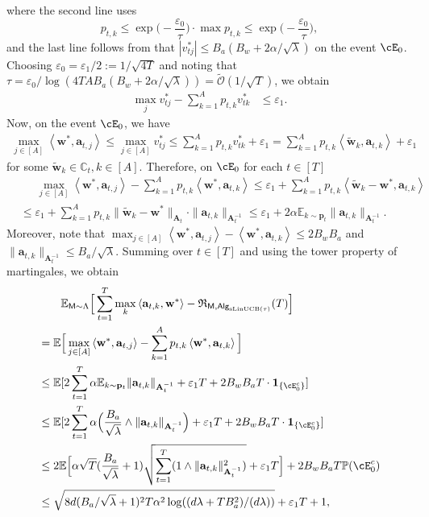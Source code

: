 \documentclass[10pt]{article}
\newcommand{\eps}{\varepsilon}
\newcommand{\<}{\left\langle}
\renewcommand{\>}{\right\rangle}
\newcommand{\E}{\mathbb{E}}
\renewcommand{\P}{\mathbb{P}}
\newcommand{\inst}{{\mathsf{M}}}
\newcommand{\sLinUCB}{{\mathrm{sLinUCB}}}
\newcommand{\temp}{{\tau}}
\newcommand{\tcO}{{\tilde{\mathcal O}}}
\newcommand{\totlen}{{T}}
\newcommand{\sAlg}{{\mathsf{Alg}}}
\newcommand{\prior}{{\Lambda}}
\newcommand{\totreward}{{\mathfrak{R}}}
\def\sC{{\mathbb{C}}}
\def\bA{{\mathbf A}}
\def\ba{{\mathbf a}}
\def\bp{{\mathbf p}}
\def\bw{{\mathbf w}}
\begin{document}
where the second line uses $$
p_{t,k}\leq\exp\Big(-\frac{\eps_0}{\temp}\Big)\cdot\max{p_{t,k}}\leq \exp\Big(-\frac{\eps_0}{\temp}\Big),
$$ and the  last line follows from that $|v^*_{tj}|\leq B_a(B_w+2\alpha/\sqrt{\lambda})$
 on the event $\cE_0$. Choosing $\eps_0=\eps_1/2:=1/\sqrt{4T}$ and noting that $\temp=\eps_0/\log(4TA B_a(B_w+2\alpha/\sqrt{\lambda}))=\tcO(1/\sqrt{T})$, we obtain
 \begin{align*}
    \max_{j}v^*_{tj}-\sum_{k=1}^A p_{t,k}v^*_{tk}&\leq\eps_1.
\end{align*}
Now, on the event $\cE_0$, we have
\begin{align*}
    \max_{j\in[A]}\<\bw^*,\ba_{t,j}\>\leq  \max_{j\in[A]}v^*_{tj}\leq \sum_{k=1}^A p_{t,k}v^*_{tk}+\eps_1 =\sum_{k=1}^A p_{t,k}\<\tilde{\bw}_k,\ba_{t,k}\>+\eps_1
\end{align*}
for some $\tilde{\bw}_k\in\sC_t,k\in[A]$.
Therefore,  on $\cE_0$ for  each $t\in[T]$
\begin{align*}
    &~~\quad\max_{j\in[A]}\<\bw^*,\ba_{t,j}\>-\sum_{k=1}^Ap_{t,k}\<\bw^*,\ba_{t,k}\>
    \leq \eps_1+ \sum_{k=1}^Ap_{t,k}\<\tilde{\bw}_k-\bw^*,\ba_{t,k}\>
    \\&\leq
    \eps_1+\sum_{k=1}^Ap_{t,k}\|\tilde{\bw}_k-\bw^*\|_{\bA_t}\cdot\|\ba_{t,k}\|_{\bA^{-1}_t}
    \leq \eps_1+ 2\alpha\E_{k\sim \bp_t}\|\ba_{t,k}\|_{\bA^{-1}_t}.
\end{align*}
 Moreover, note that $ \max_{j\in[A]}\<\bw^*,\ba_{t,j}\>-\<\bw^*,\ba_{t,k}\>\leq 2B_wB_a$ and $\|\ba_{t,k}\|_{\bA^{-1}_t}\leq B_a/\sqrt{\lambda}$.
Summing over $t\in[T]$ and using the tower property of martingales, we obtain
\begin{align*}
&\qquad\E_{\inst\sim\prior}\Big[\sum_{t=1}^\totlen\max_{k}\<\ba_{t,k},\bw^*\>-\totreward_{\inst,\sAlg_{\sLinUCB(\temp)}}(\totlen)\Big]\\
&=
\E\Big[\max_{j\in[A]}\<\bw^*,\ba_{t,j}\>-\sum_{k=1}^Ap_{t,k}\<\bw^*,\ba_{t,k}\>
 \Big]
\\
&\leq \E[2\sum_{t=1}^T\alpha\E_{k\sim \bp_t}\|\ba_{t,k}\|_{\bA^{-1}_t}+\eps_1 T +2B_wB_a T\cdot\mathbf{1}_{\{\cE^c_0\}}]\\
   &\leq
\E[2\sum_{t=1}^T\alpha\Big(\frac{B_a}{\sqrt{\lambda}}\wedge\|\ba_{t,k}\|_{\bA^{-1}_t}\Big)+\eps_1 T +2B_wB_a T\cdot\mathbf{1}_{\{\cE^c_0\}}]\\
   &\leq
2\E\Big[\alpha\sqrt{T}(\frac{B_a}{\sqrt{\lambda}}+1)\sqrt{\sum_{t=1}^T(1\wedge\|\ba_{t,k}\|^2_{\bA^{-1}_t})}+\eps_1 T\Big]+2B_wB_a T\P(\cE^c_0)\\
&\leq
\sqrt{8 d({B_a}/{\sqrt{\lambda}}+1)^2T\alpha^2\log((d\lambda+TB_a^2)/(d\lambda))}+\eps_1 T+1,
\end{align*}
\end{document}
